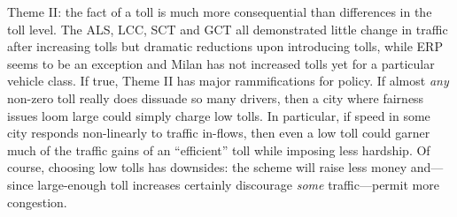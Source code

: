 Theme II: the fact of a toll is much more consequential than differences in the toll level. The ALS, LCC, SCT and GCT all demonstrated little change in traffic after increasing tolls but dramatic reductions upon introducing tolls, while ERP seems to be an exception and Milan has not increased tolls yet for a particular vehicle class. If true, Theme II has major rammifications for policy. If almost \emph{any} non-zero toll really does dissuade so many drivers, then a city where fairness issues loom large could simply charge low tolls. In particular, if speed in some city responds non-linearly to traffic in-flows, then even a low toll could garner much of the traffic gains of an ``efficient'' toll while imposing less hardship. Of course, choosing low tolls has downsides: the scheme will raise less money and---since large-enough toll increases certainly discourage \emph{some} traffic---permit more congestion.

